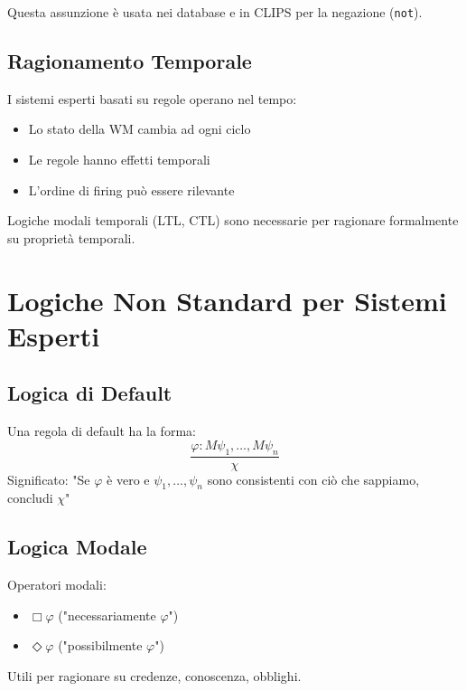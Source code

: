 Questa assunzione è usata nei database e in CLIPS per la negazione (\texttt{not}).

\subsection{Ragionamento Temporale}

I sistemi esperti basati su regole operano nel tempo:
\begin{itemize}
\item Lo stato della WM cambia ad ogni ciclo
\item Le regole hanno effetti temporali
\item L'ordine di firing può essere rilevante
\end{itemize}

Logiche modali temporali (LTL, CTL) sono necessarie per ragionare formalmente su proprietà temporali.

\section{Logiche Non Standard per Sistemi Esperti}

\subsection{Logica di Default}

\begin{definizione}
Una regola di default ha la forma:
\begin{equation}
\frac{\varphi : M\psi_1, \ldots, M\psi_n}{\chi}
\end{equation}
Significato: "Se $\varphi$ è vero e $\psi_1, \ldots, \psi_n$ sono consistenti con ciò che sappiamo, concludi $\chi$"
\end{definizione}

\subsection{Logica Modale}

Operatori modali:
\begin{itemize}
\item $\Box \varphi$ ("necessariamente $\varphi$")
\item $\Diamond \varphi$ ("possibilmente $\varphi$")
\end{itemize}

Utili per ragionare su credenze, conoscenza, obblighi.

